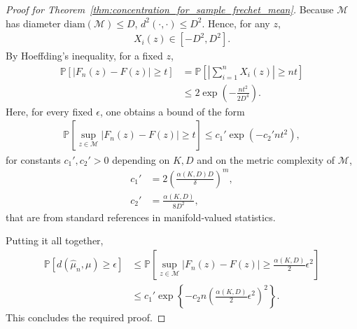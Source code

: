 \begin{proof}[Proof for Theorem~\ref{thm:concentration_for_sample_frechet_mean}]
    Because $\mathcal{M}$ has diameter $\mathrm{diam}(\mathcal{M}) \leq D$, $d^2(\cdot, \cdot) \leq D^2$.
    Hence, for any $z$,
    \begin{align*}
        X_i(z) \in [-D^2, D^2].
    \end{align*}
    By Hoeffding's inequality, for a fixed $z$,
    \begin{align*}
        \mathbb{P}\left[|F_n(z) - F(z)| \geq t \right] &= \mathbb{P}\left[\left|\sum^n_{i=1}X_i(z)\right| \geq nt \right] \\
        &\leq 2\exp\left(-\frac{nt^2}{2D^4}\right).
    \end{align*}
    Here, for every fixed $\epsilon$, one obtains a bound of the form
    \begin{align*}
        \mathbb{P}\left[\sup_{z \in \mathcal{M}}|F_n(z) - F(z)| \geq t \right] \leq c_1' \exp\left(-c_2' nt^2 \right),
    \end{align*}
    for constants $c_1', c_2' > 0$ depending on $K, D$ and on the metric complexity of $\mathcal{M}$,
    \begin{align*}
        c_1' &= 2\left(\frac{\alpha(K, D) D}{\delta}\right)^m, \\
        c_2' &= \frac{\alpha(K, D)}{8D^2},
    \end{align*}
    that are from standard references in manifold‐valued statistics.

    Putting it all together, 
    \begin{align*}
        \mathbb{P}\left[d(\hat{\mu}_n, \mu) \geq \epsilon \right] &\leq \mathbb{P}\left[\sup_{z \in \mathcal{M}}\left|F_n(z) - F(z) \right| \geq \frac{\alpha(K, D)}{2}\epsilon^2 \right] \\
        &\leq  c_1' \exp\left\{-c_2 n\left(\frac{\alpha(K, D)}{2}\epsilon^2 \right)^2\right\}.
    \end{align*}
    This concludes the required proof.
\end{proof}

